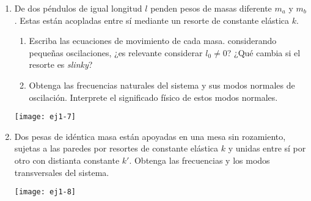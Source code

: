 \documentclass[11pt,spanish,a4paper]{article}
\begin{document}
\begin{enumerate}
\item \label{pendacop}
\begin{minipage}[t][4cm]{0.75\textwidth}
De dos péndulos de igual longitud $l$ penden pesos de masas diferente $m_a$ y $m_b$.
Estas están acopladas entre sí mediante un resorte de constante elástica $k$.
\begin{enumerate}
	\item Escriba las ecuaciones de movimiento de cada masa. considerando pequeñas oscilaciones, ¿es relevante considerar $l_0 \neq 0$?
	¿Qué cambia si el resorte es \emph{slinky}?   
	\item Obtenga las frecuencias naturales del sistema y sus modos normales de oscilación.
	Interprete el significado físico de estos modos normales. 
\end{enumerate}
\end{minipage}
\begin{minipage}[c][0cm][t]{0.2\textwidth}
  \texttt{[image: ej1-7]}
\end{minipage}



\item \label{2masitas}
\begin{minipage}[t][2cm]{0.65\textwidth}
Dos pesas de idéntica masa están apoyadas en una mesa sin rozamiento, sujetas a las paredes por resortes de constante
elástica $k$ y unidas entre sí por otro con distianta constante $k'$.
Obtenga las frecuencias y los modos transversales del sistema. 
\end{minipage}
\begin{minipage}[c][0.5cm][t]{0.3\textwidth}
  \texttt{[image: ej1-8]}
\end{minipage}





\end{enumerate}
\end{document}
